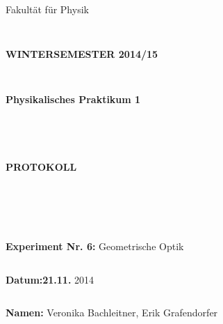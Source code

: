 \documentclass{article}
\begin{document}
\thispagestyle{empty}
			\begin{center}
			\Large{Fakultät für Physik}\\
			\end{center}
\begin{verbatim}


\end{verbatim}
			\begin{center}
			\textbf{\LARGE WINTERSEMESTER 2014/15}
			\end{center}
\begin{verbatim}


\end{verbatim}
			\begin{center}
			\textbf{\LARGE{Physikalisches Praktikum 1}}
			\end{center}
\begin{verbatim}




\end{verbatim}

			\begin{center}
			\textbf{\LARGE{PROTOKOLL}}
			\end{center}
			
\begin{verbatim}





\end{verbatim}

			\begin{flushleft}
			\Large{\textbf{Experiment Nr. 6:} Geometrische Optik}\\
			\LARGE{}	
			\end{flushleft}

\begin{verbatim}

\end{verbatim}	
			\begin{flushleft}
			\textbf{\Large{Datum:21.11.}} \Large{2014}
			\end{flushleft}
			
\begin{verbatim}
\end{verbatim}
		\begin{flushleft}
			\textbf{\Large{Namen:}} \Large{Veronika Bachleitner, Erik Grafendorfer}
			\end{flushleft}
\end{document}
